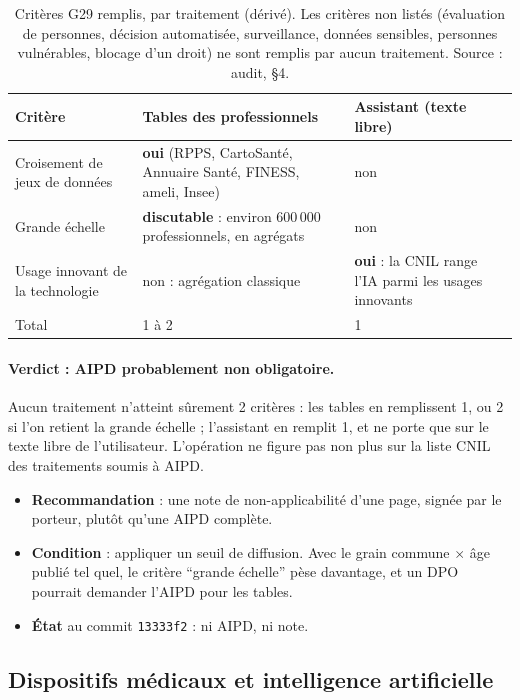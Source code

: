 \begin{table}[htbp]\centering\small
\caption{Critères G29 remplis, par traitement (dérivé). Les critères non listés (évaluation de personnes, décision automatisée, surveillance, données sensibles, personnes vulnérables, blocage d'un droit) ne sont remplis par aucun traitement. Source : audit, §4.}\label{conf:tab-aipd}
\begin{tabular}{@{}p{}p{}p{}@{}}
\toprule Critère & Tables des professionnels & Assistant (texte libre) \\ \midrule
Croisement de jeux de données & \textbf{oui} (RPPS, CartoSanté, Annuaire Santé, FINESS, ameli, Insee) & non \\
Grande échelle & \textbf{discutable} : environ 600\,000\suppose{} professionnels, en agrégats & non \\
Usage innovant de la technologie & non : agrégation classique & \textbf{oui} : la CNIL range l'IA parmi les usages innovants \\ \midrule
Total & 1 à 2\derive{} & 1\derive{} \\ \bottomrule
\end{tabular}
\end{table}

\paragraph{Verdict : AIPD probablement non obligatoire\derive{}.}
Aucun traitement n'atteint sûrement 2\mesure{} critères : les tables en remplissent 1, ou 2 si l'on retient la grande échelle ; l'assistant en remplit 1, et ne porte que sur le texte libre de l'utilisateur.
L'opération ne figure pas non plus sur la liste CNIL des traitements soumis à AIPD.
\begin{itemize}
\item \textbf{Recommandation} : une note de non-applicabilité d'une page, signée par le porteur, plutôt qu'une AIPD complète.
\item \textbf{Condition} : appliquer un seuil de diffusion. Avec le grain commune $\times$ âge publié tel quel, le critère \enquote{grande échelle} pèse davantage, et un DPO pourrait demander l'AIPD pour les tables.
\item \textbf{État} au commit \texttt{13333f2} : ni AIPD, ni note.
\end{itemize}

\subsection{Dispositifs médicaux et intelligence artificielle}\label{conf:dm-ia}


